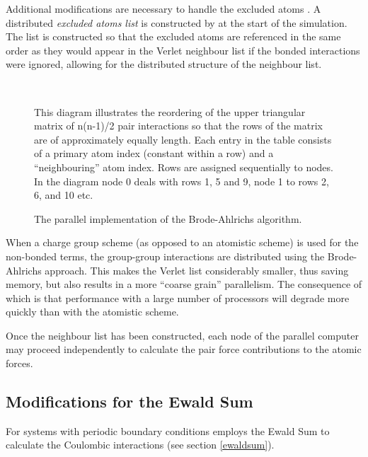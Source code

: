 Additional modifications are necessary to handle the excluded atoms
\cite{smith-93a}. A distributed {\em excluded atoms
list} is constructed by \D{} at the start of the simulation. The list is
constructed so that the excluded atoms are referenced in the same
order as they would appear in the Verlet neighbour list if the bonded
interactions were ignored, allowing for the distributed structure of
the neighbour list.

~

\vskip 5mm
\begin{figure}[ht]
\begin{center}
\centerline{}
\caption{The parallel implementation of the Brode-Ahlrichs algorithm.\label{BAscheme}}
\end{center}
This diagram illustrates the reordering of the upper triangular matrix
of n(n-1)/2 pair interactions so that the rows of the matrix are of
approximately equally length.  Each entry in the table consists of a
primary atom index (constant within a row) and a ``neighbouring'' atom
index.  Rows are assigned sequentially to nodes. In the diagram node 0
deals with rows 1, 5 and 9, node 1 to rows 2, 6, and 10 etc.
\end{figure}
\vskip 5mm

When a charge group scheme (as opposed to an atomistic scheme) is used
for the non-bonded terms, the group-group interactions are distributed
using the Brode-Ahlrichs approach. This makes the Verlet list
considerably smaller, thus saving memory, but also results in a more
``coarse grain'' parallelism. The consequence of which is that
performance with a large number of processors will degrade more
quickly than with the atomistic scheme.

Once the neighbour list has been constructed, each node of the
parallel computer may proceed independently to calculate the pair
force contributions to the atomic forces. 

\subsection{Modifications for the Ewald Sum}

For systems with periodic boundary conditions \D{} employs the Ewald Sum
to calculate the Coulombic interactions (see section \ref{ewaldsum}).

